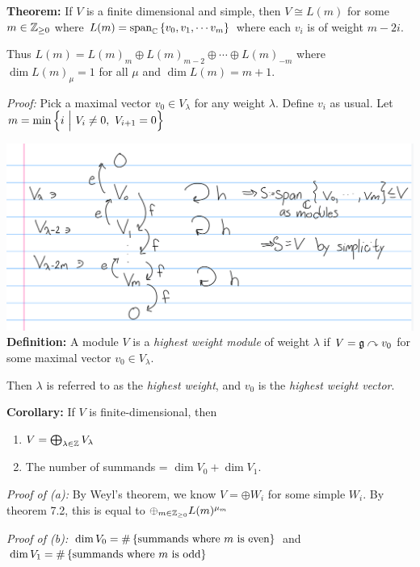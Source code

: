 \textbf{Theorem:} If \(V\) is a finite dimensional and simple, then
\(V \cong L(m)\) for some \(m \in {\mathbb{Z}}_{\geq 0}\) where
\(L(m) = \mathrm{span}_{\mathbb{C}}\left\{{v_0, v_1, \cdots v_m}\right\}\) where each
\(v_i\) is of weight \(m - 2i\).

Thus \(L(m) = L(m)_m \oplus L(m)_{m-2} \oplus \cdots \oplus L(m)_{-m}\)
where \(\dim L(m)_\mu = 1\) for all \(\mu\) and \(\dim L(m) = m+1\).

\emph{Proof:} Pick a maximal vector \(v_0 \in V_\lambda\) for any weight
\(\lambda\). Define \(v_i\) as usual. Let
\(m = \min \left\{{i {~\mathrel{\Big|}~} V_i \neq 0,~ V_{i+1} = 0}\right\}\)

\includegraphics{figures/2019-09-18-09:42.png}\\

\textbf{Definition:} A module \(V\) is a \emph{highest weight module} of
weight \(\lambda\) if \(V = {\mathfrak{g}}\curvearrowright v_0\) for some maximal vector
\(v_0 \in V_\lambda\).

Then \(\lambda\) is referred to as the \emph{highest weight}, and
\(v_0\) is the \emph{highest weight vector}.

\textbf{Corollary:} If \(V\) is finite-dimensional, then

\begin{enumerate}
\def\labelenumi{\alph{enumi}.}
\tightlist
\item
  \(V = \bigoplus_{\lambda \in {\mathbb{Z}}} V_\lambda\)
\item
  The number of summands = \(\dim V_0 + \dim V_1\).
\end{enumerate}

\emph{Proof of (a):} By Weyl's theorem, we know \(V = \oplus W_i\) for
some simple \(W_i\). By theorem 7.2, this is equal to
\(\oplus_{m\in {\mathbb{Z}}_{\geq 0}} L(m)^{\mu_m}\)

\emph{Proof of (b):}
\(\dim V_0 = \#\left\{{\text{summands where $m$ is even}}\right\}\) and
\(\dim V_1 = \#\left\{{\text{summands where $m$ is odd}}\right\}\)

